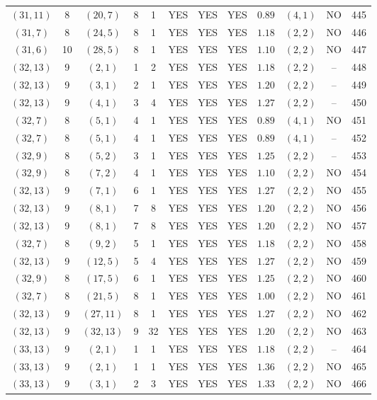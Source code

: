 \begin{longtable}{|c|c|c|c|c|c|c|c|c|c|c|c|}
$(31,11)$ & 8 & $(20,7)$ & 8 & 1 & YES & YES & YES & $0.89$ & $(4,1)$ & NO & 445\\
$(31,7)$ & 8 & $(24,5)$ & 8 & 1 & YES & YES & YES & $1.18$ & $(2,2)$ & NO & 446\\
$(31,6)$ & 10 & $(28,5)$ & 8 & 1 & YES & YES & YES & $1.10$ & $(2,2)$ & NO & 447\\
$(32,13)$ & 9 & $(2,1)$ & 1 & 2 & YES & YES & YES & $1.18$ & $(2,2)$ & -- & 448\\
$(32,13)$ & 9 & $(3,1)$ & 2 & 1 & YES & YES & YES & $1.20$ & $(2,2)$ & -- & 449\\
$(32,13)$ & 9 & $(4,1)$ & 3 & 4 & YES & YES & YES & $1.27$ & $(2,2)$ & -- & 450\\
$(32,7)$ & 8 & $(5,1)$ & 4 & 1 & YES & YES & YES & $0.89$ & $(4,1)$ & NO & 451\\
$(32,7)$ & 8 & $(5,1)$ & 4 & 1 & YES & YES & YES & $0.89$ & $(4,1)$ & -- & 452\\
$(32,9)$ & 8 & $(5,2)$ & 3 & 1 & YES & YES & YES & $1.25$ & $(2,2)$ & -- & 453\\
$(32,9)$ & 8 & $(7,2)$ & 4 & 1 & YES & YES & YES & $1.10$ & $(2,2)$ & NO & 454\\
$(32,13)$ & 9 & $(7,1)$ & 6 & 1 & YES & YES & YES & $1.27$ & $(2,2)$ & NO & 455\\
$(32,13)$ & 9 & $(8,1)$ & 7 & 8 & YES & YES & YES & $1.20$ & $(2,2)$ & NO & 456\\
$(32,13)$ & 9 & $(8,1)$ & 7 & 8 & YES & YES & YES & $1.20$ & $(2,2)$ & NO & 457\\
$(32,7)$ & 8 & $(9,2)$ & 5 & 1 & YES & YES & YES & $1.18$ & $(2,2)$ & NO & 458\\
$(32,13)$ & 9 & $(12,5)$ & 5 & 4 & YES & YES & YES & $1.27$ & $(2,2)$ & NO & 459\\
$(32,9)$ & 8 & $(17,5)$ & 6 & 1 & YES & YES & YES & $1.25$ & $(2,2)$ & NO & 460\\
$(32,7)$ & 8 & $(21,5)$ & 8 & 1 & YES & YES & YES & $1.00$ & $(2,2)$ & NO & 461\\
$(32,13)$ & 9 & $(27,11)$ & 8 & 1 & YES & YES & YES & $1.27$ & $(2,2)$ & NO & 462\\
$(32,13)$ & 9 & $(32,13)$ & 9 & 32 & YES & YES & YES & $1.20$ & $(2,2)$ & NO & 463\\
$(33,13)$ & 9 & $(2,1)$ & 1 & 1 & YES & YES & YES & $1.18$ & $(2,2)$ & -- & 464\\
$(33,13)$ & 9 & $(2,1)$ & 1 & 1 & YES & YES & YES & $1.36$ & $(2,2)$ & NO & 465\\
$(33,13)$ & 9 & $(3,1)$ & 2 & 3 & YES & YES & YES & $1.33$ & $(2,2)$ & NO & 466\\

\end{longtable}
